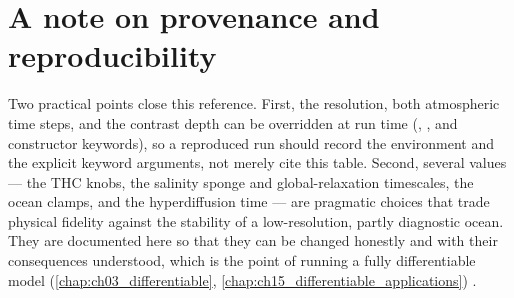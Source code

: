 \section{A note on provenance and reproducibility}

Two practical points close this reference. First, the resolution, both
atmospheric time steps, and the contrast depth can be overridden at run time
(, , and constructor keywords),
so a reproduced run should record the environment and the explicit keyword
arguments, not merely cite this table. Second, several values --- the THC knobs,
the salinity sponge and global-relaxation timescales, the ocean clamps, and the
hyperdiffusion time --- are pragmatic choices that trade physical fidelity against
the stability of a low-resolution, partly diagnostic ocean. They are documented
here so that they can be changed honestly and with their consequences understood,
which is the point of running a fully differentiable model
(\ref{chap:ch03_differentiable}, \ref{chap:ch15_differentiable_applications})
\citep{jax2018, vallis2017, griffies2004, semtner1976}.
